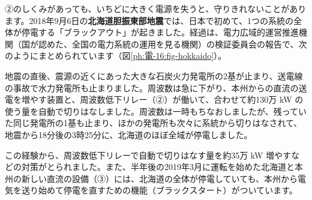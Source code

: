 \leavevmode\label{ph:電-16:sec4}②のしくみがあっても、いちどに大きく電源を失うと、守りきれないことがあります。2018年9月6日の\textbf{北海道胆振東部地震}では、日本で初めて、1つの系統の全体が停電する「ブラックアウト」が起きました。経過は、電力広域的運営推進機関（国が認めた、全国の電力系統の運用を見る機関）の検証委員会の報告で、次のようにまとめられています（図\ref{ph:電-16:fig-hokkaido}）。
\begin{bkfigure}
\label{ph:電-16:fig-hokkaido}
\end{bkfigure}
地震の直後、震源の近くにあった大きな石炭火力発電所の2基が止まり、送電線の事故で水力発電所も止まりました。周波数は急に下がり、本州からの直流の送電を増やす装置と、周波数低下リレー（②）が働いて、合わせて約130万 kW の使う量を自動で切りはなしました。周波数は一時もちなおしましたが、残っていた同じ発電所の1基も止まり、ほかの発電所も次々に系統から切りはなされて、地震から18分後の3時25分に、北海道のほぼ全域が停電しました。

この経験から、周波数低下リレーで自動で切りはなす量を約35万 kW 増やすなどの対策がとられました。また、半年後の2019年3月に運転を始めた北海道と本州の新しい直流の設備（③）には、北海道の全体が停電していても、本州から電気を送り始めて停電を直すための機能（ブラックスタート）がついています。

